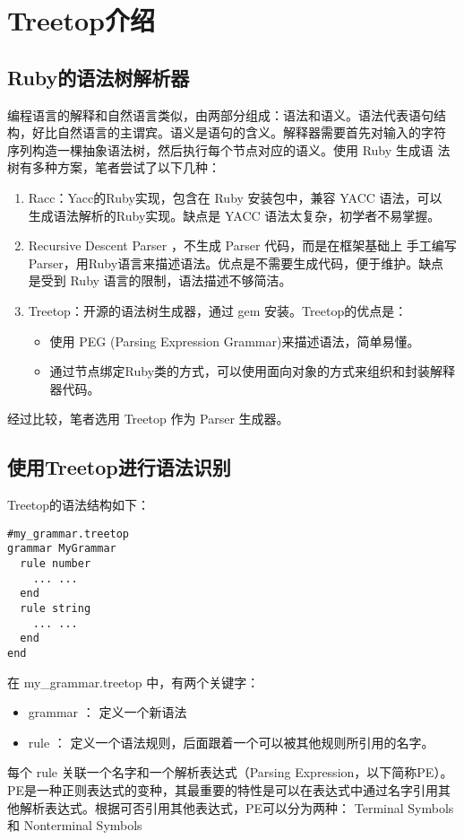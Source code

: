 \documentclass{article}
\begin{document}
\section{Treetop介绍}

\subsection{Ruby的语法树解析器}

编程语言的解释和自然语言类似，由两部分组成：语法和语义。语法代表语句结
构，好比自然语言的主谓宾。语义是语句的含义。解释器需要首先对输入的字符
序列构造一棵抽象语法树，然后执行每个节点对应的语义。使用 Ruby 生成语
法树有多种方案，笔者尝试了以下几种：
\begin{enumerate}
\item Racc：Yacc的Ruby实现，包含在 Ruby 安装包中，兼容 YACC 语法，可以
  生成语法解析的Ruby实现。缺点是 YACC 语法太复杂，初学者不易掌握。
\item Recursive Descent Parser ，不生成 Parser 代码，而是在框架基础上
  手工编写 Parser，用Ruby语言来描述语法。优点是不需要生成代码，便于维护。缺点 是受到 Ruby
  语言的限制，语法描述不够简洁。
\item Treetop：开源的语法树生成器，通过 gem 安装。Treetop的优点是：
  \begin{itemize}
  \item 使用 PEG (Parsing Expression Grammar)来描述语法，简单易懂。
  \item 通过节点绑定Ruby类的方式，可以使用面向对象的方式来组织和封装解释器代码。
  \end{itemize}

\end{enumerate}
经过比较，笔者选用 Treetop 作为 Parser 生成器。
\subsection{使用Treetop进行语法识别}

Treetop的语法结构如下：
\begin{lstlisting}
#my_grammar.treetop
grammar MyGrammar
  rule number
    ... ...
  end
  rule string
    ... ...
  end
end
\end{lstlisting}

在 my\_grammar.treetop 中，有两个关键字：
\begin{itemize}
\item grammar ： 定义一个新语法
\item rule ： 定义一个语法规则，后面跟着一个可以被其他规则所引用的名字。
\end{itemize}
每个 rule 关联一个名字和一个解析表达式（Parsing Expression，以下简称PE）。PE是一种正则表达式的变种，其最重要的特性是可以在表达式中通过名字引用其
他解析表达式。根据可否引用其他表达式，PE可以分为两种：
Terminal Symbols 和 Nonterminal Symbols
\end{document}
